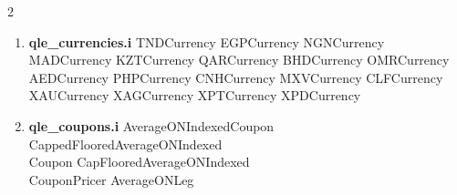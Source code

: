 \documentclass[10pt]{article}
\begin{document}
\begin{multicols}{2}
\begin{enumerate}
                \subitem Wmr
        \item \textbf{qle\_currencies.i}
                \subitem TNDCurrency
                \subitem EGPCurrency
                \subitem NGNCurrency
                \subitem MADCurrency
                \subitem KZTCurrency
                \subitem QARCurrency
                \subitem BHDCurrency
                \subitem OMRCurrency
                \subitem AEDCurrency
                \subitem PHPCurrency
                \subitem CNHCurrency
                \subitem MXVCurrency
                \subitem CLFCurrency
                \subitem XAUCurrency
                \subitem XAGCurrency
                \subitem XPTCurrency
                \subitem XPDCurrency
        \item \textbf{qle\_coupons.i}
                \subitem AverageONIndexedCoupon
                \subitem CappedFlooredAverageONIndexed \\ \-\hspace{0.70cm}Coupon
                \subitem CapFlooredAverageONIndexed \\ \-\hspace{0.70cm}CouponPricer
                \subitem AverageONLeg
    \end{enumerate}
\end{multicols}

\pagebreak
\end{document}
